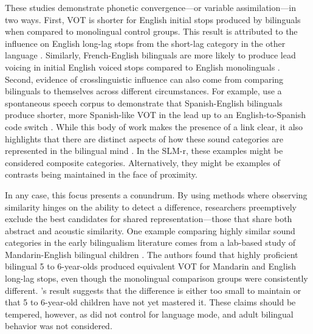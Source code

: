 These studies demonstrate phonetic convergence---or variable assimilation---in two ways. First, VOT is shorter for English initial stops produced by bilinguals when compared to monolingual control groups. This result is attributed to the influence on English long-lag stops from the short-lag category in the other language \citep{olson_2016_transfer}. Similarly, French-English bilinguals are more likely to produce lead voicing in initial English voiced stops compared to English monolinguals \citep{sundara_2006_production}. Second, evidence of crosslinguistic influence can also come from comparing bilinguals to themselves across different circumstances. For example, \citet{fricke_2016_phonetic} use a spontaneous speech corpus to demonstrate that Spanish-English bilinguals produce shorter, more Spanish-like VOT in the lead up to an English-to-Spanish code switch \citep{fricke_2016_phonetic}. While this body of work makes the presence of a link clear, it also highlights that there are distinct aspects of how these sound categories are represented in the bilingual mind \citep{casillas_2021_interlingual}. In the SLM-r, these examples might be considered composite categories. Alternatively, they might be examples of contrasts being maintained in the face of proximity.

In any case, this focus presents a conundrum. By using methods where observing similarity hinges on the ability to detect a difference, researchers preemptively exclude the best candidates for shared representation---those that share both abstract and acoustic similarity. One example comparing highly similar sound categories in the early bilingualism literature comes from a lab-based study of Mandarin-English bilingual children \citep{yang_2019_vot}. The authors found that highly proficient bilingual 5 to 6-year-olds produced equivalent VOT for Mandarin and English long-lag stops, even though the monolingual comparison groups were consistently different. \citeauthor{yang_2019_vot}'s result suggests that the difference is either too small to maintain or that 5 to 6-year-old children have not yet mastered it. These claims should be tempered, however, as \citet{yang_2019_vot} did not control for language mode, and adult bilingual behavior was not considered. 

